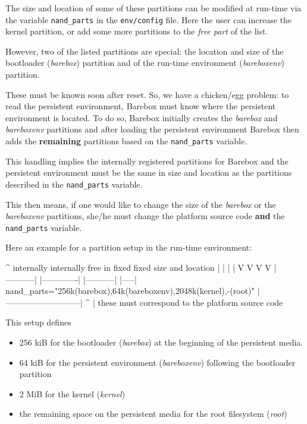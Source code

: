 The size and location of some of these partitions can be modified at run-time
via the variable \texttt{nand_parts} in the \texttt{env/config} file. Here the
user can increase the kernel partition, or add some more partitions to the
\textit{free part} of the list.

However, two of the listed partitions are special: the location and size of
the bootloader (\textit{barebox}) partition and of the run-time environment
(\textit{bareboxenv}) partition.
%
%
%

These must be known soon after reset. So, we have a chicken/egg problem: to
read the persistent environment, Barebox must know where the persistent environment
is located. To do so, Barebox initially creates the \textit{barebox} and
\textit{bareboxenv} partitions and after loading the persistent environment
Barebox then adds the \textbf{remaining} partitions based on the
\texttt{nand_parts} variable.

This handling implies the internally registered partitions for Barebox and the
persistent environment must be the same in size and location as the partitions
described in the \texttt{nand_parts} variable.

This then means, if one would like to change the size of the \textit{barebox}
or the \textit{bareboxenv} partitions, she/he must change the platform source
code \textbf{and} the \texttt{nand_parts} variable.

Here an example for a partition setup in the run-time environment:

\begin{ptxshell}[escapechar=|]{^}
              internally    internally            free in
               fixed          fixed           size and location
                 |              |              |           |
                 V              V              V           V
            |-----------| |-------------| |-----------| |-----|
nand_parts="256k(barebox),64k(bareboxenv),2048k(kernel),-(root)"
            |---------------------------|
                        ^
                        |
              these must correspond to
              the platform source code
\end{ptxshell}

This setup defines

\begin{itemize}
 \item 256 kiB for the bootloader (\textit{barebox}) at the beginning of the
  persistent media.
 \item 64 kiB for the persistent environment (\textit{bareboxenv}) following
  the bootloader partition
 \item 2 MiB for the kernel (\textit{kernel})
 \item the remaining space on the persistent media for the root filesystem
  (\textit{root})
\end{itemize}

